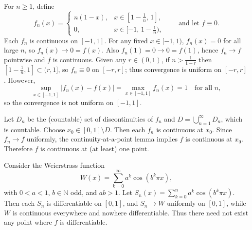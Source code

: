 \begin{problem}[CP-II-0432]
For $n\ge1$, define
\[
f_n(x)=
\begin{cases}
	n(1-x),& x\in[1-\tfrac1n,\,1],\\
	0,& x\in[-1,\,1-\tfrac1n),
\end{cases}
\qquad\text{and let } f\equiv 0.
\]
Each $f_n$ is continuous on $[-1,1]$. For any fixed $x\in[-1,1)$, $f_n(x)=0$ for all large $n$, so $f_n(x)\to 0=f(x)$. Also $f_n(1)=0\to 0=f(1)$, hence $f_n\to f$ pointwise and $f$ is continuous. Given any $r\in(0,1)$, if $n>\frac1{1-r}$ then $[1-\frac1n,1]\subset (r,1]$, so $f_n\equiv 0$ on $[-r,r]$; thus convergence is uniform on $[-r,r]$. However,
\[
\sup_{x\in[-1,1]}|f_n(x)-f(x)|=\max_{x\in[-1,1]} f_n(x)=1 \quad\text{for all }n,
\]
so the convergence is not uniform on $[-1,1]$.

Let $D_n$ be the (countable) set of discontinuities of $f_n$ and $D=\bigcup_{n=1}^\infty D_n$, which is countable. Choose $x_0\in[0,1]\setminus D$. Then each $f_n$ is continuous at $x_0$. Since $f_n\to f$ uniformly, the continuity-at-a-point lemma implies $f$ is continuous at $x_0$. Therefore $f$ is continuous at (at least) one point.

Consider the Weierstrass function
\[
W(x)=\sum_{k=0}^\infty a^k\cos(b^k\pi x),
\]
with $0<a<1$, $b\in\mathbb{N}$ odd, and $ab>1$. Let $S_n(x)=\sum_{k=0}^n a^k\cos(b^k\pi x)$. Then each $S_n$ is differentiable on $[0,1]$, and $S_n\to W$ uniformly on $[0,1]$, while $W$ is continuous everywhere and nowhere differentiable. Thus there need not exist any point where $f$ is differentiable.
\end{problem}


